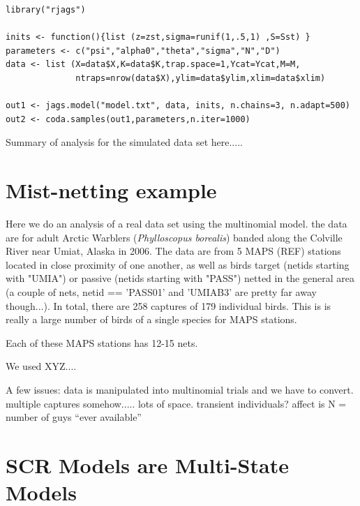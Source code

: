 {{\small
\begin{verbatim}
library("rjags")

inits <- function(){list (z=zst,sigma=runif(1,.5,1) ,S=Sst) }              
parameters <- c("psi","alpha0","theta","sigma","N","D")
data <- list (X=data$X,K=data$K,trap.space=1,Ycat=Ycat,M=M,
              ntraps=nrow(data$X),ylim=data$ylim,xlim=data$xlim)         

out1 <- jags.model("model.txt", data, inits, n.chains=3, n.adapt=500)
out2 <- coda.samples(out1,parameters,n.iter=1000)
\end{verbatim}
}


Summary of analysis for the simulated data set here.....  



\section{ Mist-netting example}

Here we do an analysis of a real data set using the multinomial model.
the data are for 
adult Arctic Warblers ({\it Phylloscopus borealis}) banded 
 along the Colville River near Umiat, Alaska in 2006. The data are from 
 5 MAPS (REF) stations located in close proximity of one another, as
 well as 
 birds target (netids starting with "UMIA") or passive (netids starting 
 with "PASS") netted in the general area (a couple of nets, 
 netid == 'PASS01' and 'UMIAB3' are pretty far away though...). In total, 
 there are 258 captures of 179 individual birds. This is is really a 
 large number of birds of a single species for MAPS stations. 
 
Each of these MAPS stations has 12-15 nets.

We used XYZ....
 
A few issues:
 data is manipulated into multinomial trials and we have to convert.
 multiple captures somehow.....
 lots of space.
 transient individuals?  affect is N = number of guys ``ever available''
 


\section{SCR Models are Multi-State Models}

}
